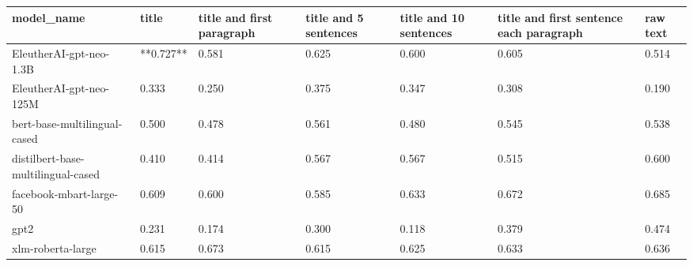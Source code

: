 \begin{tabular}{lllllll}
\toprule
                        model\_name &     title & title and first paragraph & title and 5 sentences & title and 10 sentences & title and first sentence each paragraph & raw text \\
\midrule
           EleutherAI-gpt-neo-1.3B & **0.727** &                     0.581 &                 0.625 &                  0.600 &                                   0.605 &    0.514 \\
           EleutherAI-gpt-neo-125M &     0.333 &                     0.250 &                 0.375 &                  0.347 &                                   0.308 &    0.190 \\
      bert-base-multilingual-cased &     0.500 &                     0.478 &                 0.561 &                  0.480 &                                   0.545 &    0.538 \\
distilbert-base-multilingual-cased &     0.410 &                     0.414 &                 0.567 &                  0.567 &                                   0.515 &    0.600 \\
           facebook-mbart-large-50 &     0.609 &                     0.600 &                 0.585 &                  0.633 &                                   0.672 &    0.685 \\
                              gpt2 &     0.231 &                     0.174 &                 0.300 &                  0.118 &                                   0.379 &    0.474 \\
                 xlm-roberta-large &     0.615 &                     0.673 &                 0.615 &                  0.625 &                                   0.633 &    0.636 \\
\bottomrule
\end{tabular}
